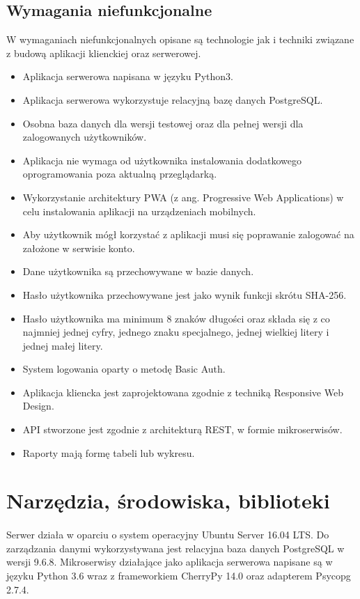 \documentclass{article}
\begin{document}
	\subsection{Wymagania niefunkcjonalne}
	W wymaganiach niefunkcjonalnych opisane są technologie jak i techniki związane z budową aplikacji klienckiej oraz serwerowej.
	\begin{itemize}
		\item Aplikacja serwerowa napisana w języku Python3.
		\item Aplikacja serwerowa wykorzystuje relacyjną bazę danych PostgreSQL.
		\item Osobna baza danych dla wersji testowej oraz dla pełnej wersji dla zalogowanych użytkowników.
		\item Aplikacja nie wymaga od użytkownika instalowania dodatkowego oprogramowania poza aktualną przeglądarką.
		\item Wykorzystanie architektury PWA (z ang. Progressive Web Applications) w celu instalowania aplikacji na urządzeniach mobilnych.
		\item Aby użytkownik mógł korzystać z aplikacji musi się poprawanie zalogować na założone w serwisie konto.
		\item Dane użytkownika są przechowywane w bazie danych.
		\item Hasło użytkownika przechowywane jest jako wynik funkcji skrótu SHA-256.
		\item Hasło użytkownika ma minimum 8 znaków długości oraz składa się z co najmniej jednej cyfry, jednego znaku specjalnego, jednej wielkiej litery i jednej małej litery.
		\item System logowania oparty o metodę Basic Auth.
		\item Aplikacja kliencka jest zaprojektowana zgodnie z techniką Responsive Web Design.
		\item API stworzone jest zgodnie z architekturą REST, w formie mikroserwisów.
		\item Raporty mają formę tabeli lub wykresu.
	\end{itemize}
	\section{Narzędzia, środowiska, biblioteki}
	\paragraph{}Serwer działa w oparciu o system operacyjny Ubuntu Server 16.04 LTS.
	Do zarządzania danymi wykorzystywana jest relacyjna baza danych PostgreSQL w wersji 9.6.8.
	Mikroserwisy działające jako aplikacja serwerowa napisane są w języku Python 3.6 wraz z frameworkiem CherryPy 14.0 oraz adapterem Psycopg 2.7.4.
\end{document}
